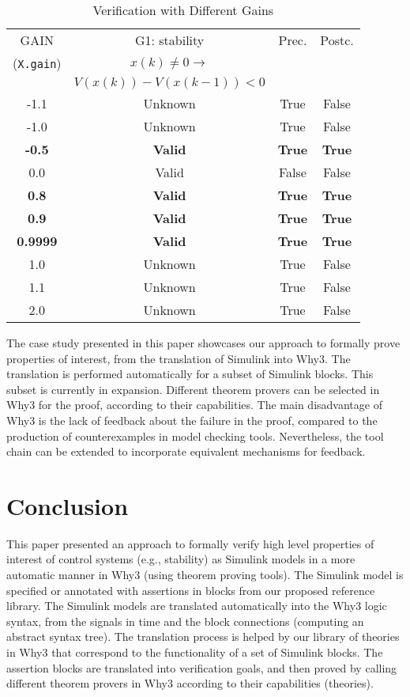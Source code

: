 \documentclass[a4paper]{article}
\begin{document}
\begin{table}[!t]
\renewcommand{\arraystretch}{1.3}
\caption{Verification with Different Gains}
\label{setp}
\centering
\begin{tabular}{|c|c|c|c|}
\hline
GAIN&G1: stability&Prec.&Postc.\\ 
(\verb+X.gain+\normalsize )&$x(k)\neq0 \rightarrow$&&\\
&$V(x(k))-V(x(k-1))<0$&& \\ \hline \hline
-1.1&Unknown&True&False \\ \hline
-1.0&Unknown&True&False \\ \hline
\textbf{-0.5}&\textbf{Valid}&\textbf{True}&\textbf{True} \\ \hline
0.0&Valid&False&False\\ \hline
\textbf{0.8}&\textbf{Valid}&\textbf{True}&\textbf{True}\\ \hline
\textbf{0.9}&\textbf{Valid}&\textbf{True}&\textbf{True}\\ \hline
\textbf{0.9999}&\textbf{Valid}&\textbf{True}&\textbf{True}\\ \hline 
1.0&Unknown&True&False \\ \hline
1.1&Unknown&True&False \\ \hline
2.0&Unknown&True&False \\ \hline
\end{tabular}
\end{table}


The case study presented in this paper showcases our approach to formally prove properties of interest, from the translation of Simulink into Why3. The translation is performed automatically for a subset of Simulink blocks. This subset is currently in expansion. Different theorem provers can be selected in Why3 for the proof, according to their capabilities. The main disadvantage of Why3 is the lack of feedback about the failure in the proof, compared to the production of counterexamples in model checking tools. Nevertheless, the tool chain can be extended to incorporate equivalent mechanisms for feedback.

\section{Conclusion} \label{conclusion}
This paper presented an approach to formally verify high level properties of interest of control systems (e.g., stability) as Simulink models in a more automatic manner in Why3 (using theorem proving tools). The Simulink model is specified or annotated with assertions in blocks from our proposed reference library. The Simulink models are translated automatically into the Why3 logic syntax, from the signals in time and the block connections (computing an abstract syntax tree). The translation process is helped by our library of theories in Why3 that correspond to the functionality of a set of Simulink blocks. The assertion blocks are translated into verification goals, and then proved by calling different theorem provers in Why3 according to their capabilities (theories). 
\end{document}

